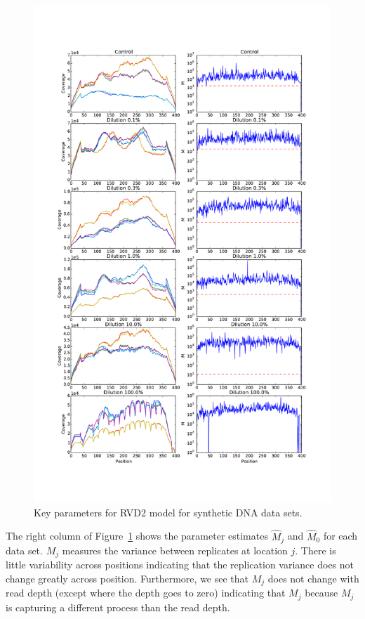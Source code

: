 \documentclass[11pt,reqno]{amsart}
\begin{document}
\begin{figure}[htbp]
\begin{center}
\includegraphics[width=120mm]{pdf_figs/depthM.pdf}
\caption{Key parameters for RVD2 model for synthetic DNA data sets.}
\label{fig:depthM}
\end{center}
\end{figure}


The right column of Figure~\ref{fig:depthM} shows the parameter estimates $\hat{M}_j$ and $\hat{M}_0$ for each data set. $M_j$ measures the variance between replicates at location $j$. There is little variability across positions indicating that the replication variance does not change greatly across position. Furthermore, we see that $M_j$ does not change with read depth (except where the depth goes to zero) indicating that $M_j$ because $M_j$ is capturing a different process than the read depth. 
\end{document}
